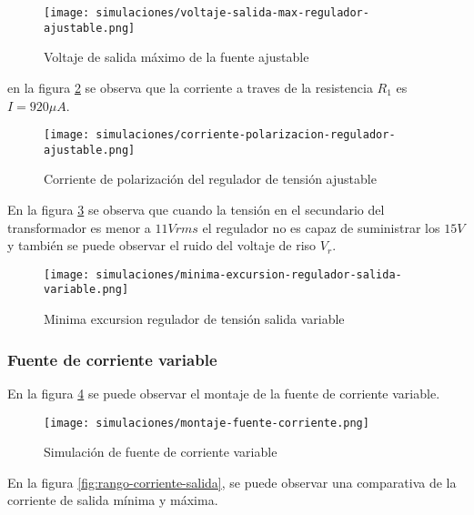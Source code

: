 \begin{figure}[ht]
    \centering
    \texttt{[image: simulaciones/voltaje-salida-max-regulador-ajustable.png]}
    \caption{Voltaje de salida máximo de la fuente ajustable}
    \label{fig:voltaje-salida-max-regulador-ajustable}
\end{figure}

en la figura \ref{fig:corriente-polarizacion-regulador-ajustable} se observa que la corriente a traves de la resistencia $R_1$ es $I = 920 \mu A$.

\begin{figure}
    \centering
    \texttt{[image: simulaciones/corriente-polarizacion-regulador-ajustable.png]}
    \caption{Corriente de polarización del regulador de tensión ajustable}
    \label{fig:corriente-polarizacion-regulador-ajustable}
\end{figure}

En la figura \ref{fig:minima-excursion-regulador-salida-variable} se observa que cuando la tensión en el secundario del transformador es menor a $11 Vrms$ el regulador no es capaz de suministrar los $15V$ y también se puede observar el ruido del voltaje de riso $V_r$.

\begin{figure}
    \centering
    \texttt{[image: simulaciones/minima-excursion-regulador-salida-variable.png]}
    \caption{Minima excursion regulador de tensión salida variable}
    \label{fig:minima-excursion-regulador-salida-variable}
\end{figure}

\FloatBarrier
\subsubsection{Fuente de corriente variable}

En la figura \ref{fig:simulacion-fuente-corriente} se puede observar el montaje de la fuente de corriente variable.

\begin{figure}[ht]
    \centering
    \texttt{[image: simulaciones/montaje-fuente-corriente.png]}
    \caption{Simulación de fuente de corriente variable}
    \label{fig:simulacion-fuente-corriente}
\end{figure}

En la figura \ref{fig:rango-corriente-salida}, se puede observar una comparativa de la corriente de salida mínima y máxima.

